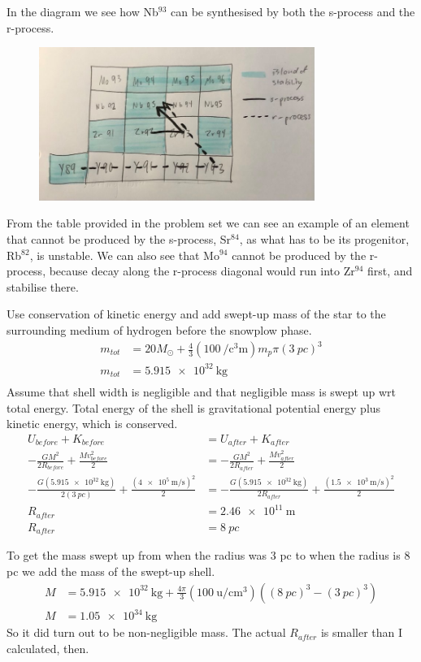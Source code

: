 \documentclass[newpage]{homework}
\begin{document}
\question
In the diagram we see how Nb$^{93}$ can be synthesised by both the s-process and the r-process.
\begin{figure}[htbp]
    \centering
    \includegraphics[width=0.8\textwidth]{nuclides.jpg}
\end{figure}

From the table provided in the problem set we can see an example of an element that cannot be produced by the s-process, Sr$^{84}$, as what has to be its progenitor, Rb$^{82}$, is unstable. We can also see that Mo$^{94}$ cannot be produced by the r-process, because decay along the r-process diagonal would run into Zr$^{94}$ first, and stabilise there.

\question
Use conservation of kinetic energy and add swept-up mass of the star to the surrounding medium of hydrogen before the snowplow phase.
\begin{align*}
    m_{tot}	&=	20 M_\odot + \frac{4}{3} (\SI{100}{\per\cubic\centi\metre}) m_p \pi (\SI{3}{pc})^3  	\\
    m_{tot} &=  \SI{5.915e32}{\kilogram} \\
\end{align*}
Assume that shell width is negligible and that negligible mass is swept up wrt total energy. Total energy of the shell is gravitational potential energy plus kinetic energy, which is conserved.
\begin{align*}
    U_{before} + K_{before}    &=	U_{after} + K_{after}	\\
    -\frac{GM^2}{2R_{before}} + \frac{Mv_{befor e}^2}{2}    &= -\frac{GM^2}{2R_{after}} + \frac{Mv_{after}^2}{2}	\\
    -\frac{G (\SI{5.915e32}{\kilogram})}{2 (\SI{3}{pc})} + \frac{(\SI{4e5}{\metre\per\second})^2}{2}    &= -\frac{G (\SI{5.915e32}{\kilogram})}{2R_{after}} + \frac{(\SI{1.5e3}{\metre\per\second})^2}{2}	\\
    R_{after}    &= \SI{2.46e11}{\metre}    \\
    R_{after}   &=  \boxed{\SI{8}{pc}}
\end{align*}

To get the mass swept up from when the radius was 3 pc to when the radius is 8 pc we add the mass of the swept-up shell.
\begin{align*}
    M	&=	\SI{5.915e32}{\kilogram} + \frac{4\pi}{3} (\SI{100}{\atomicmassunit\per\centi\metre^3}) ((\SI{8}{pc})^3 - (\SI{3}{pc})^3)	\\
    M   &=  \boxed{\SI{1.05e34}{\kilogram}}
\end{align*}
So it did turn out to be non-negligible mass. The actual $R_{after}$ is smaller than I calculated, then.
\end{document}
